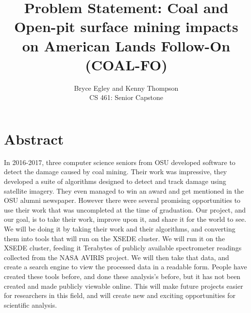 \documentclass{article}
\begin{document}

\title{Problem Statement: Coal and Open-pit surface mining impacts on American
Lands Follow-On (COAL-FO)}
\author{Bryce Egley and Kenny Thompson \\CS 461: Senior Capstone}

\maketitle

%
%

\section*{Abstract}
In 2016-2017, three computer science seniors from OSU developed software to
detect the damage caused by coal mining. Their work was impressive, they
developed a suite of algorithms designed to detect and track damage using
satellite imagery. They even managed to win an award and get mentioned in the
OSU alumni newspaper. However there were several promising opportunities to use
their work that was uncompleted at the time of graduation. Our project, and our
goal, is to take their work, improve upon it, and share it for the world to
see. We will be doing it by taking their work and their algorithms, and
converting them into tools that will run on the XSEDE cluster. We will run it
on the XSEDE cluster, feeding it Terabytes of publicly available spectrometer
readings collected from the NASA AVIRIS project. We will then take that data,
and create a search engine to view the processed data in a readable form.
People have created these tools before, and done these analysis’s before, but
it has not been created and made publicly viewable online. This will make
future projects easier for researchers in this field, and will create new and
exciting opportunities for scientific analysis.
\end{document}
